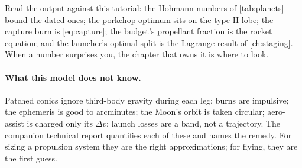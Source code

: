 \documentclass[11pt,letterpaper,oneside]{report}
\newcommand{\dv}{\Delta v}
\begin{document}
Read the output against this tutorial: the Hohmann numbers of \cref{tab:planets} bound the dated
ones; the porkchop optimum sits on the type-II lobe; the capture burn is \cref{eq:capture}; the
budget's propellant fraction is the rocket equation; and the launcher's optimal split is the
Lagrange result of \cref{ch:staging}. When a number surprises you, the chapter that owns it is
where to look.

\paragraph{What this model does not know.} Patched conics ignore third-body gravity during each
leg; burns are impulsive; the ephemeris is good to arcminutes; the Moon's orbit is taken
circular; aero-assist is charged only its $\dv$; launch losses are a band, not a trajectory.
The companion technical report quantifies each of these and names the remedy. For sizing a
propulsion system they are the right approximations; for flying, they are the first guess.

\appendix
\end{document}
